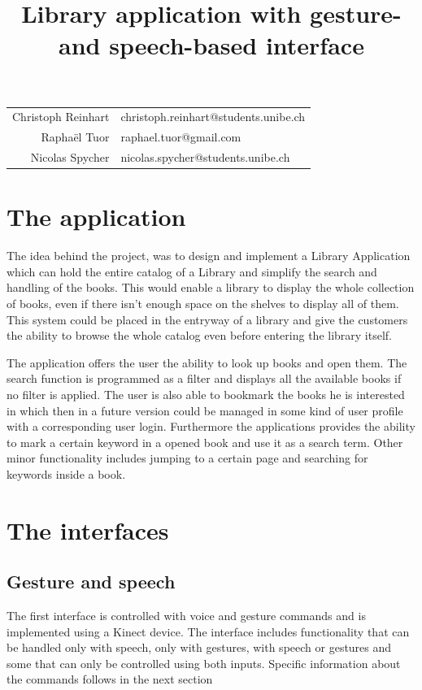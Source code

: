 \documentclass[a4paper, 10pt]{article}
\begin{document}
	\title{Library application with gesture- and speech-based interface}
	\maketitle
	
	\begin{tabular}{rl}
		Christoph Reinhart  & christoph.reinhart@students.unibe.ch\\
		Raphaël Tuor  & raphael.tuor@gmail.com\\
		Nicolas Spycher & nicolas.spycher@students.unibe.ch
	\end{tabular}
	
	\newpage	
	\section{The application}
	
	\par{The idea behind the project, was to design and implement a Library Application which can hold the entire catalog of a Library and simplify the search and handling of the books. This would enable a library to display the whole collection of books, even if there isn't enough space on the shelves to display all of them. This system could be placed in the entryway of a library and give the customers the ability to browse the whole catalog even before entering the library itself.}
	\par{The application offers the user the ability to look up books and open them. The search function is programmed as a filter and displays all the available books if no filter is applied. The user is also able to bookmark the books he is interested in which then in a future version could be managed in some kind of user profile with a corresponding user login. Furthermore the applications provides the ability to mark a certain keyword in a opened book and use it as a search term. Other minor functionality includes jumping to a certain page and searching for keywords inside a book.}
	
	
	\section{The interfaces}
	
	\subsection{Gesture and speech}
	
	\par{The first interface is controlled with voice and gesture commands and is implemented using a Kinect device. The interface includes functionality that can be handled only with speech, only with gestures, with speech or gestures and some that can only be controlled using both inputs. Specific information about the commands follows in the next section}
	
\end{document}
